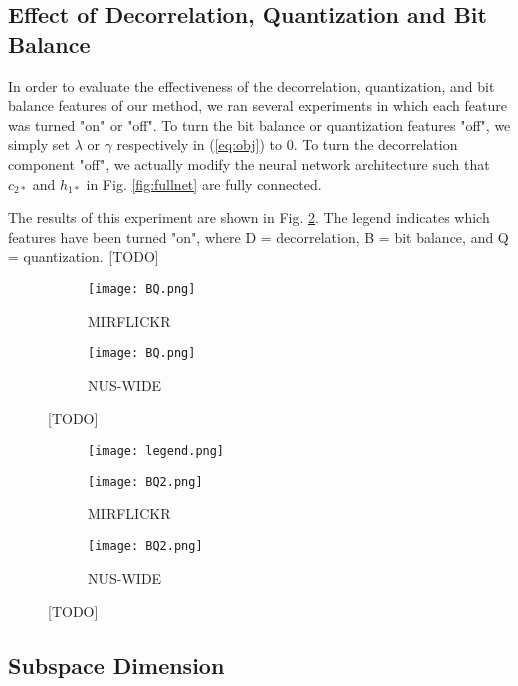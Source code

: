 \documentclass[letterpaper]{article}
\begin{document}
\subsection{Effect of Decorrelation, Quantization and Bit Balance}

In order to evaluate the effectiveness of the decorrelation, quantization, and bit balance features of our method, we ran several experiments in which each feature was turned "on" or "off". To turn the bit balance or quantization features "off", we simply set $ \lambda $ or $ \gamma $ respectively in (\ref{eq:obj}) to 0. To turn the decorrelation component "off", we actually modify the neural network architecture such that $ c_{2*} $ and $ h_{1*} $ in Fig. \ref{fig:fullnet} are fully connected.

The results of this experiment are shown in Fig. \ref{fig:BQ2}. The legend indicates which features have been turned "on", where D = decorrelation, B = bit balance, and Q = quantization. [TODO]

\begin{figure}
	
	\begin{subfigure}{\columnwidth}
		\texttt{[image: BQ.png]}
		\caption{MIRFLICKR}
	\end{subfigure}
	\begin{subfigure}{\columnwidth}
		\texttt{[image: BQ.png]}
		\caption{NUS-WIDE}
	\end{subfigure}
	\caption{\label{fig:BQ}[TODO]}
	
\end{figure}

\begin{figure}
	
	\begin{subfigure}{\columnwidth}
		\centering
		\texttt{[image: legend.png]}
	\end{subfigure}	
	\begin{subfigure}{0.5\columnwidth}
		\texttt{[image: BQ2.png]}
		\caption{MIRFLICKR}
	\end{subfigure}
	\begin{subfigure}{0.5\columnwidth}
		\texttt{[image: BQ2.png]}
		\caption{NUS-WIDE}
	\end{subfigure}
	\caption{\label{fig:BQ2}[TODO]}
	
\end{figure}

\subsection{Subspace Dimension}
\end{document}
